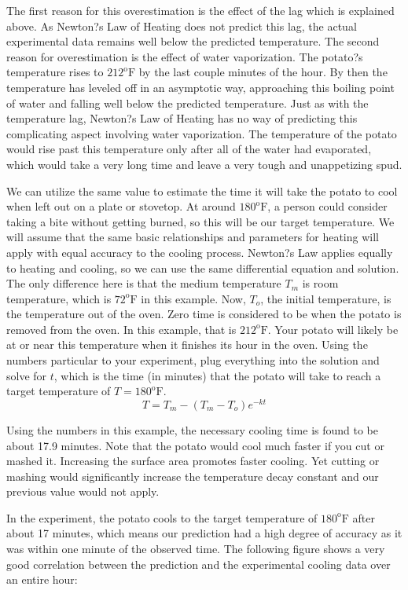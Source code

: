 \documentclass{ximera}
\begin{document}
The first reason for this overestimation is the effect of the lag which is explained above.  As Newton?s Law of Heating does not predict this lag, the actual experimental data remains well below the predicted temperature.  The second reason for overestimation is the effect of water vaporization.  The potato?s temperature rises to $212^{\text{o}}\text{F}$ by the last couple minutes of the hour.  By then the temperature has leveled off in an asymptotic way, approaching this boiling point of water and falling well below the predicted temperature.  Just as with the temperature lag, Newton?s Law of Heating has no way of predicting this complicating aspect involving water vaporization.  The temperature of the potato would rise past this temperature only after all of the water had evaporated, which would take a very long time and leave a very tough and unappetizing spud.

We can utilize the same  value to estimate the time it will take the potato to cool when left out on a plate or stovetop.  At around $180^{\text{o}}\text{F}$, a person could consider taking a bite without getting burned, so this will be our target temperature.  We will assume that the same basic relationships and parameters for heating will apply with equal accuracy to the cooling process.  Newton?s Law applies equally to heating and cooling, so we can use the same differential equation and solution.  The only difference here is that the medium temperature  $T_m$ is room temperature, which is $72^{\text{o}}\text{F}$  in this example.  Now, $T_o$, the initial temperature, is the temperature out of the oven.  Zero time is considered to be when the potato is removed from the oven.  In this example, that is $212^{\text{o}}\text{F}$.  Your potato will likely be at or near this temperature when it finishes its hour in the oven.  Using the numbers particular to your experiment, plug everything into the solution and solve for $t$, which is the time (in minutes) that the potato will take to reach a target temperature of $T=180^{\text{o}}\text{F}$.
\[
T=T_m-(T_m-T_o ) e^{-kt}
\]

Using the numbers in this example, the necessary cooling time is found to be about 17.9 minutes.  Note that the potato would cool much faster if you cut or mashed it.  Increasing the surface area promotes faster cooling.  Yet cutting or mashing would significantly increase the temperature decay constant and our previous value would not apply.

In the experiment, the potato cools to the target temperature of $180^{\text{o}}\text{F}$ after about 17 minutes, which means our prediction had a high degree of accuracy as it was within one minute of the observed time. The following figure shows a very good correlation between the prediction and the experimental cooling data over an entire hour:
 
\end{document}
